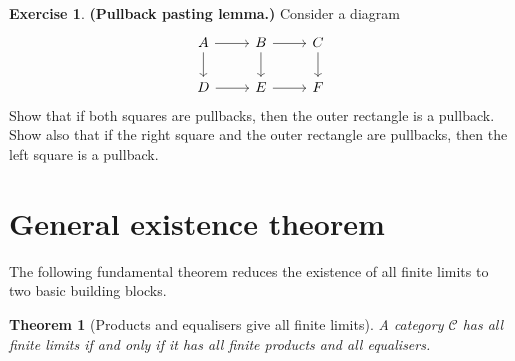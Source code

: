\documentclass[a4paper,12pt]{book}
\theoremstyle{definition}
\newtheorem{exercise}[definition]{Exercise}
\theoremstyle{plain}
\newtheorem{theorem}[definition]{Theorem}
\theoremstyle{remark}
\begin{document}
\begin{exercise}\label{exer:pullback-pasting}
\textbf{(Pullback pasting lemma.)}
Consider a diagram
\[
\begin{tikzcd}
A \arrow[r] \arrow[d] & B \arrow[r] \arrow[d] & C \arrow[d] \\
D \arrow[r] & E \arrow[r] & F
\end{tikzcd}
\]
Show that if both squares are pullbacks, then the outer rectangle
is a pullback.  Show also that if the right square and the outer
rectangle are pullbacks, then the left square is a pullback.
\end{exercise}


\section{General existence theorem}\label{sec:limit-existence}

The following fundamental theorem reduces the existence of all finite
limits to two basic building blocks.

\begin{theorem}[Products and equalisers give all finite limits]%
\label{thm:prod-eq-limits}
A category $\mathcal{C}$ has all finite limits if and only if it has all
finite products and all equalisers.
\end{theorem}
\end{document}
